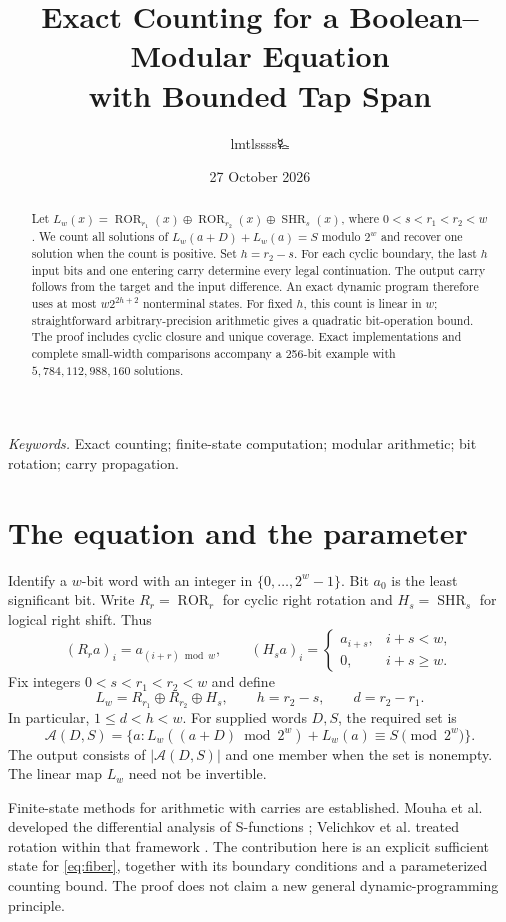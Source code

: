 \documentclass[11pt,a4paper]{article}
\title{\LARGE Exact Counting for a Boolean--Modular Equation\\with Bounded Tap Span}
\author{lmtlssss{\authorsymbol 🜐}}
\date{27 October 2026}
\theoremstyle{definition}\newtheorem{definition}[theorem]{Definition}
\newcommand{\rot}{\operatorname{ROR}}
\newcommand{\shr}{\operatorname{SHR}}
\begin{document}
\maketitle\thispagestyle{plain}
\begin{abstract}
Let $L_w(x)=\rot_{r_1}(x)\oplus\rot_{r_2}(x)\oplus\shr_s(x)$, where
$0<s<r_1<r_2<w$. We count all solutions of
$L_w(a+D)+L_w(a)=S$ modulo $2^w$ and recover one solution when the count is positive.
Set $h=r_2-s$. For each cyclic boundary, the last $h$ input bits and one entering
carry determine every legal continuation. The output carry follows from the target
and the input difference. An exact dynamic program therefore uses at most
$w2^{2h+2}$ nonterminal states. For fixed $h$, this count is linear in $w$;
straightforward arbitrary-precision arithmetic gives a quadratic bit-operation bound.
The proof includes cyclic closure and unique coverage. Exact implementations and
complete small-width comparisons accompany a 256-bit example with
$5{,}784{,}112{,}988{,}160$ solutions.
\end{abstract}
\noindent\textit{Keywords.} Exact counting; finite-state computation; modular arithmetic;
bit rotation; carry propagation.

\section{The equation and the parameter}
Identify a $w$-bit word with an integer in $\{0,\ldots,2^w-1\}$.
Bit $a_0$ is the least significant bit. Write $R_r=\rot_r$ for cyclic right
rotation and $H_s=\shr_s$ for logical right shift. Thus
\[
 (R_ra)_i=a_{(i+r)\bmod w},\qquad
 (H_sa)_i=\begin{cases}a_{i+s},&i+s<w,\\0,&i+s\geq w.\end{cases}
\]
Fix integers $0<s<r_1<r_2<w$ and define
\begin{equation}\label{eq:map}
 L_w=R_{r_1}\oplus R_{r_2}\oplus H_s,
 \qquad h=r_2-s,\qquad d=r_2-r_1.
\end{equation}
In particular, $1\leq d<h<w$. For supplied words $D,S$, the required set is
\begin{equation}\label{eq:fiber}
 \mathcal A(D,S)=\{a:L_w((a+D)\bmod 2^w)+L_w(a)\equiv S\pmod{2^w}\}.
\end{equation}
The output consists of $|\mathcal A(D,S)|$ and one member when the set is nonempty.
The linear map $L_w$ need not be invertible.

Finite-state methods for arithmetic with carries are established.
Mouha et al. developed the differential analysis of S-functions
\cite{mouha2011}; Velichkov et al. treated rotation within that framework
\cite{velichkov2011}. The contribution here is an explicit sufficient state
for \eqref{eq:fiber}, together with its boundary conditions and a parameterized
counting bound. The proof does not claim a new general dynamic-programming principle.
\end{document}
